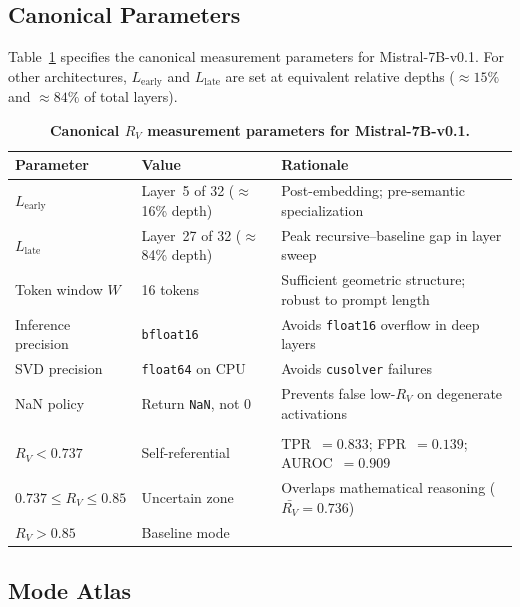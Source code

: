 \documentclass{article}
\newcommand{\RV}{R_V}
\begin{document}
\subsection{Canonical Parameters}

Table~\ref{tab:params} specifies the canonical measurement parameters for Mistral-7B-v0.1.
For other architectures, $L_\mathrm{early}$ and $L_\mathrm{late}$ are set at equivalent relative
depths (${\approx}15\%$ and ${\approx}84\%$ of total layers).

\begin{table}[ht]
\centering
\caption{\textbf{Canonical $\RV$ measurement parameters for Mistral-7B-v0.1.}}
\label{tab:params}
\smallskip
\small
\begin{tabular}{>{\raggedright}p{2.8cm}p{3.0cm}p{5.0cm}}
\toprule
\textbf{Parameter} & \textbf{Value} & \textbf{Rationale} \\
\midrule
$L_\mathrm{early}$ & Layer~5 of 32 ($\approx$16\% depth) & Post-embedding; pre-semantic specialization \\
$L_\mathrm{late}$  & Layer~27 of 32 ($\approx$84\% depth) & Peak recursive--baseline gap in layer sweep \\
Token window $W$   & 16 tokens & Sufficient geometric structure; robust to prompt length \\
Inference precision & \texttt{bfloat16} & Avoids \texttt{float16} overflow in deep layers \\
SVD precision      & \texttt{float64} on CPU & Avoids \texttt{cusolver} failures \\
NaN policy         & Return \texttt{NaN}, not 0 & Prevents false low-$\RV$ on degenerate activations \\
\midrule
\multicolumn{3}{l}{\textit{Detection threshold (Mistral-7B only)}} \\
$\RV < 0.737$              & Self-referential & TPR~$= 0.833$; FPR~$= 0.139$; AUROC~$= 0.909$ \\
$0.737 \leq \RV \leq 0.85$ & Uncertain zone   & Overlaps mathematical reasoning ($\bar{\RV} = 0.736$) \\
$\RV > 0.85$               & Baseline mode    & \\
\bottomrule
\end{tabular}
\end{table}

\subsection{Mode Atlas}
\label{sec:modes}
\end{document}
